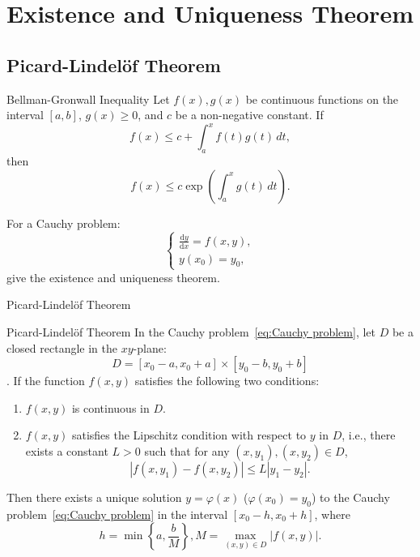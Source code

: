 \documentclass[11pt]{../../TexTemplate/elegantbook}
\begin{document}
\chapter{Existence and Uniqueness Theorem}
\section{Picard-Lindelöf Theorem}
\begin{theorem}{Bellman-Gronwall Inequality}
    Let \(f(x), g(x)\) be continuous functions on the interval \([a, b]\),
    \(g(x) \geqslant  0\), and \(c\) be a non-negative constant.
    If
    \[
    f(x) \leqslant  c + \int_{a}^{x} f(t) g(t) \, dt,
    \]
    then
    \[
    f(x) \leqslant  c \exp\left(\int_{a}^{x} g(t) \, dt\right).
    \]
\end{theorem}

For a Cauchy problem:
\begin{equation}\label{eq:Cauchy problem}
\begin{cases}
    \frac{\mathrm{d}y}{\mathrm{d}x} = f(x, y), \\
    y(x_0) = y_0,
\end{cases}
\end{equation}
give the existence and uniqueness theorem.

\begin{leftbarTitle}{Picard-Lindelöf Theorem}\end{leftbarTitle}
\begin{theorem}{Picard-Lindelöf Theorem}
    In the Cauchy problem~\eqref{eq:Cauchy problem},
    let \(D\) be a closed rectangle in the \(xy\)-plane: 
    \[
    D = [x_{0}-a, x_{0}+a] \times [y_{0}-b, y_{0}+b]
    \].
    If the function \(f(x, y)\) satisfies the following two conditions:
    \begin{enumerate}
        \item \(f(x, y)\) is continuous in \(D\).
        \item \(f(x, y)\) satisfies the Lipschitz condition with respect to \(y\) in \(D\), 
            i.e., there exists a constant \(L > 0\) such that for any \((x, y_1), (x, y_2) \in D\),
            \[
            |f(x, y_1) - f(x, y_2)| \leqslant  L |y_1 - y_2|.
            \]
    \end{enumerate}
    Then there exists a unique solution \(y = \varphi(x)\) (\(\varphi(x_0) = y_0\)) to the Cauchy problem~\eqref{eq:Cauchy problem}
    in the interval \([x_{0}-h, x_{0}+h]\), where
    \[
    h = \min\left\{a, \frac{b}{M}\right\}, M = \max_{(x, y) \in D} |f(x, y)|.
    \]
\end{theorem}
\end{document}
